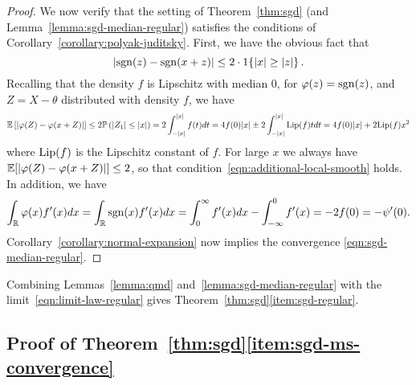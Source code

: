 \begin{proof}
  We now verify that the setting of Theorem~\ref{thm:sgd}
  (and Lemma~\ref{lemma:sgd-median-regular}) satisfies the
  conditions of Corollary~\ref{corollary:polyak-juditsky}. First, we have
  the obvious fact that
  \begin{equation*}
    |\mathrm{sgn}(z) - \mathrm{sgn}(x + z)|
    \le 2 \cdot 1\!\left\{|x| \ge |z|\right\}.
  \end{equation*}
  Recalling that the density $f$ is Lipschitz with median 0,
  for $\varphi(z) = \mathrm{sgn}(z)$, and $Z = X - \theta$ distributed with
  density $f$, we have
  \begin{align*}
    \mathbb{E}\left[  \left| \varphi(Z) - \varphi(x + Z) \right| \right]
    \leq 2 \mathbb{P}\left( |Z_1| \le |x|  \right)
    = 2 \int_{-|x|}^{|x|} f(t) dt
    = 4 f(0)|x| \pm 2 \int_{-|x|}^{|x|}
    {\rm \textup{Lip}}(f) t dt
    = 4 f(0) |x| + 2 {\rm \textup{Lip}}(f) x^2
  \end{align*}
  where ${\rm \textup{Lip}}(f)$ is the Lipschitz constant of $f$.
  For large $x$ we always have
  $\mathbb{E}[|\varphi(Z) - \varphi(x + Z)|] \le 2$, so that
  condition~\eqref{eqn:additional-local-smooth} holds.
  In addition, we have
  \begin{equation*}
    \int_{\mathbb{R}} \varphi(x) f'(x ) dx
    = \int_{\mathbb{R}} \mathrm{sgn}(x) f'(x ) dx =
    \int_0^\infty f'(x ) dx
    - \int_{-\infty}^0 f'(x )
    = -2 f(0) = -\psi'(0).
  \end{equation*}
  Corollary~\ref{corollary:normal-expansion}
  now implies the convergence \eqref{eqn:sgd-median-regular}.
\end{proof}

Combining Lemmas~\ref{lemma:qmd} and~\ref{lemma:sgd-median-regular}
with the limit~\eqref{eqn:limit-law-regular} gives
Theorem~\ref{thm:sgd}\eqref{item:sgd-regular}.

\subsection{Proof of Theorem~\ref{thm:sgd}\eqref{item:sgd-ms-convergence}}
\label{sec:proof-sgd-ms-convergence}

